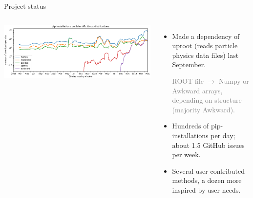 \documentclass[aspectratio=169]{beamer}
\begin{document}
\begin{frame}{Project status}
\large
\begin{columns}
\begin{center}
\includegraphics[width=0.9\linewidth]{pip-scientificlinux-uproot.pdf}
\end{center}

\vspace{-0.35 cm}
\begin{itemize}
\item Made a dependency of uproot (reads particle physics data files) last September.

\textcolor{gray}{\normalsize ROOT file $\to$ Numpy or Awkward arrays, depending on structure (majority Awkward).}

\item Hundreds of pip-installations per day; about 1.5 GitHub issues per week.
\item Several user-contributed methods, a dozen more inspired by user needs.
\end{itemize}
\end{columns}
\end{frame}
\end{document}
